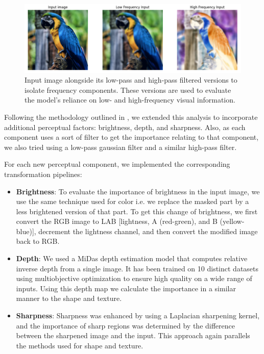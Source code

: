 \begin{figure}[htbp]
    \centering
    \includegraphics[width=\linewidth]{images/Low-Pass and High-Pass Filtered.png}
    \caption{Input image alongside its low-pass and high-pass filtered versions to isolate frequency components. These versions are used to evaluate the model's reliance on low- and high-frequency visual information.}
    \label{fig:freq_components}
\end{figure}

Following the methodology outlined in \cite{yarici2024explaining}, we extended this analysis to incorporate additional perceptual factors: brightness, depth, and sharpness. Also, as each component uses a sort of filter to get the importance relating to that component, we also tried using a low-pass gaussian filter and a similar high-pass filter. 

For each new perceptual component, we implemented the corresponding transformation pipelines:
\begin{itemize}
    \item \textbf{Brightness}: To evaluate the importance of brightness in the input image, we use the same technique used for color i.e. we replace the masked part by a less brightened version of that part. To get this change of brightness, we first convert the RGB image to LAB [lightness, A (red-green), and B (yellow-blue)], decrement the lightness channel, and then convert the modified image back to RGB.
    \item \textbf{Depth}: We used a MiDas \cite{ranftl2020towards} depth estimation model that computes relative inverse depth from a single image. It has been trained on 10 distinct datasets using multiobjective optimization to ensure high quality on a wide range of inputs. Using this depth map we calculate the importance in a similar manner to the shape and texture.
    \item \textbf{Sharpness}: Sharpness was enhanced by using a Laplacian sharpening kernel, and the importance of sharp regions was determined by the difference between the sharpened image and the input. This approach again parallels the methods used for shape and texture.
\end{itemize}

